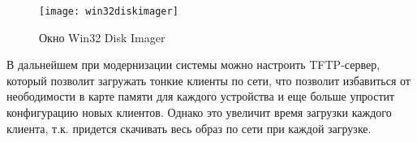 \begin{figure}[p]
    \center
    \texttt{[image: win32diskimager]}
    \caption{Окно Win32 Disk Imager}
    \label{pic:win32di}
\end{figure}

В дальнейшем при модернизации системы можно настроить TFTP-сервер, который позволит
загружать тонкие клиенты по сети, что позволит избавиться от неободимости в карте
памяти для каждого устройства и еще больше упростит конфигурацию новых клиентов. Однако
это увеличит время загрузки каждого клиента, т.к. придется скачивать весь образ по сети
при каждой загрузке.
